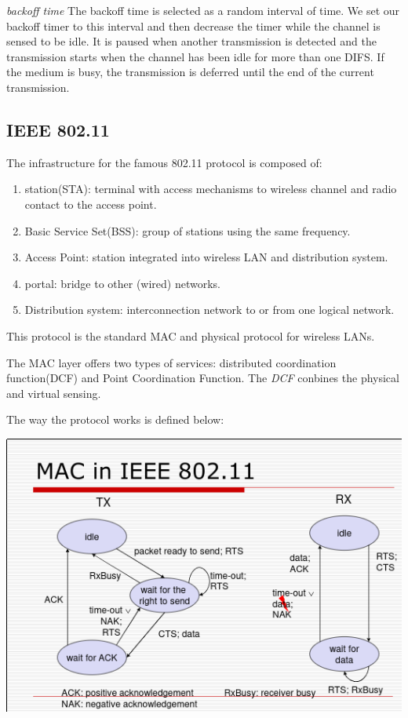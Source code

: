 \documentclass{article}
\begin{document}
\textit{backoff time} The backoff time is selected as a random interval of time. We set our backoff timer to this 
interval and then decrease the timer while the channel is sensed to be idle. It is paused when another transmission
is detected and  the transmission starts when the channel has been idle for more than one DIFS. If the medium is busy,
the transmission is deferred until the end of the current transmission.
\subsection{IEEE 802.11}
The infrastructure for the famous 802.11 protocol is composed of:
\begin{enumerate}
		\item{station(STA)}: terminal with access mechanisms to wireless channel and radio contact to the access
				point.
		\item{Basic Service Set(BSS)}: group of stations using the same frequency.
		\item{Access Point}: station integrated into wireless LAN and distribution system.
		\item{portal}: bridge to other (wired) networks.
		\item{Distribution system}: interconnection network to or from one logical network.
\end{enumerate}
 This protocol is the standard MAC and physical protocol for wireless LANs.

 The MAC layer offers two types of services: distributed coordination function(DCF) and Point Coordination Function.
The \textit{DCF} conbines the physical and virtual sensing.

The way the protocol works is defined below:

\hfill\includegraphics[scale=.50]{wifi}\hspace*{\fill}
\end{document}
